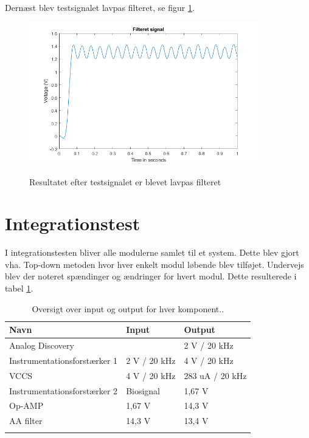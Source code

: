 Dernæst blev testsignalet lavpas filteret, se figur \ref{fig:modultestprocessFilter}.

\begin{figure}[H] 
\centering
{\includegraphics[width=10cm]
{Figure/modultestprocessFilter}}
\caption{Resultatet efter testsignalet er blevet lavpas filteret}
\label{fig:modultestprocessFilter}
\end{figure}


\section{Integrationstest}

I integrationstesten bliver alle modulerne samlet til et system. Dette blev gjort vha. Top-down metoden hvor hver enkelt modul løbende blev tilføjet. Undervejs blev der noteret spændinger og ændringer for hvert modul. Dette resulterede i tabel \ref{tab:inout}. 

\begin{table}[H]
\center
\begin{tabularx}{\linewidth}{l  X  X}
     \textbf{Navn}	&	\textbf{Input}		&	\textbf{Output}  \\ \midrule
     
     Analog Discovery	&		&	2 V / 20 kHz         \\   \addlinespace[2mm]
     Instrumentationsforstærker 1	&	2 V / 20 kHz	&	4 V / 20 kHz         \\   \addlinespace[2mm]
     VCCS	&	4 V / 20 kHz	&	283 uA / 20 kHz        \\   \addlinespace[2mm]
     Instrumentationsforstærker 2	&	Biosignal	&	1,67 V         \\   \addlinespace[2mm]
     Op-AMP	&	1,67 V 	&	14,3 V        \\   \addlinespace[2mm]	
     AA filter	&	14,3 V 	&	13,4 V        \\   \addlinespace[2mm]
     \bottomrule                                                                                                                   
    \end{tabularx}
    \caption {Oversigt over input og output for hver komponent..}
    \label{tab:inout}
	
\end{table}

